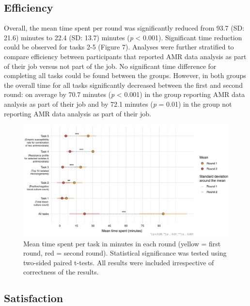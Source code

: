 \documentclass[
]{book}
\begin{document}
\hypertarget{efficiency}{%
\subsection{Efficiency}\label{efficiency}}

Overall, the mean time spent per round was significantly reduced from 93.7 (SD: 21.6) minutes to 22.4 (SD: 13.7) minutes (\emph{p} \textless{} 0.001). Significant time reduction could be observed for tasks 2-5 (Figure 7). Analyses were further stratified to compare efficiency between participants that reported AMR data analysis as part of their job versus not part of the job. No significant time difference for completing all tasks could be found between the groups. However, in both groups the overall time for all tasks significantly decreased between the first and second round: on average by 70.7 minutes (\emph{p} \textless{} 0.001) in the group reporting AMR data analysis as part of their job and by 72.1 minutes (\emph{p} = 0.01) in the group not reporting AMR data analysis as part of their job.

\begin{figure}

{\centering \includegraphics[width=1\linewidth]{images/06-07} 

}

\caption{Mean time spent per task in minutes in each round (yellow = first round, red = second round). Statistical significance was tested using two-sided paired t-tests. All results were included irrespective of correctness of the results.}\label{fig:fig6-7}
\end{figure}

\hypertarget{satisfaction}{%
\subsection{Satisfaction}\label{satisfaction}}
\end{document}
